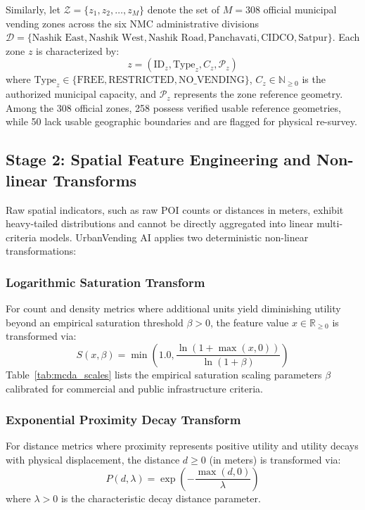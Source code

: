 Similarly, let $\mathcal{Z} = \{z_1, z_2, \dots, z_M\}$ denote the set of $M = 308$ official municipal vending zones across the six NMC administrative divisions $\mathcal{D} = \{\text{Nashik East}, \text{Nashik West}, \text{Nashik Road}, \text{Panchavati}, \text{CIDCO}, \text{Satpur}\}$. Each zone $z$ is characterized by:
\begin{equation}
    z = \left( \text{ID}_z, \text{Type}_z, C_z, \mathcal{P}_z \right)
    \label{eq:zone_tuple}
\end{equation}
where $\text{Type}_z \in \{\text{FREE}, \text{RESTRICTED}, \text{NO\_VENDING}\}$, $C_z \in \mathbb{N}_{\ge 0}$ is the authorized municipal capacity, and $\mathcal{P}_z$ represents the zone reference geometry. Among the 308 official zones, 258 possess verified usable reference geometries, while 50 lack usable geographic boundaries and are flagged for physical re-survey.

\subsection{Stage 2: Spatial Feature Engineering and Non-linear Transforms}
\label{sec:meth_stage2}

Raw spatial indicators, such as raw POI counts or distances in meters, exhibit heavy-tailed distributions and cannot be directly aggregated into linear multi-criteria models. UrbanVending AI applies two deterministic non-linear transformations:

\subsubsection{Logarithmic Saturation Transform}
For count and density metrics where additional units yield diminishing utility beyond an empirical saturation threshold $\beta > 0$, the feature value $x \in \mathbb{R}_{\ge 0}$ is transformed via:
\begin{equation}
    S(x, \beta) = \min\left(1.0, \frac{\ln(1 + \max(x, 0))}{\ln(1 + \beta)}\right)
    \label{eq:saturation}
\end{equation}
Table~\ref{tab:mcda_scales} lists the empirical saturation scaling parameters $\beta$ calibrated for commercial and public infrastructure criteria.

\subsubsection{Exponential Proximity Decay Transform}
For distance metrics where proximity represents positive utility and utility decays with physical displacement, the distance $d \ge 0$ (in meters) is transformed via:
\begin{equation}
    P(d, \lambda) = \exp\left( -\frac{\max(d, 0)}{\lambda} \right)
    \label{eq:proximity}
\end{equation}
where $\lambda > 0$ is the characteristic decay distance parameter.

